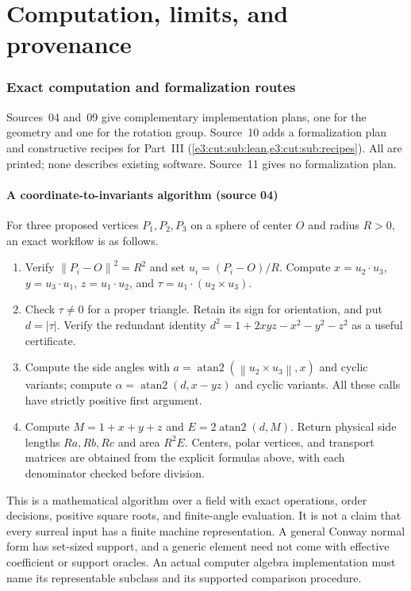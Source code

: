 \documentclass[11pt,letterpaper]{article}
\numberwithin{equation}{section}
\theoremstyle{definition}
\theoremstyle{remark}
\newcommand{\atantwo}{\operatorname{atan2}}
\newcommand{\norm}[1]{\left\lVert#1\right\rVert}
\begin{document}
\part{Computation, limits, and provenance}\label{e3:part:limits}

\section{Exact computation and formalization routes}\label{e3:sec:implementation}

Sources~04 and~09 give complementary implementation plans, one for the
geometry and one for the rotation group. Source~10 adds a formalization plan
and constructive recipes for Part~III (\cref{e3:cut:sub:lean,e3:cut:sub:recipes}).
All are printed; none describes existing software. Source~11 gives no
formalization plan.

\subsection{A coordinate-to-invariants algorithm (source 04)}\label{e3:sub:impl04}

For three proposed vertices $P_1,P_2,P_3$ on a sphere of center $O$
and radius $R>0$, an exact workflow is as follows.
\begin{enumerate}[label=\arabic*.,leftmargin=2em]
\item Verify $\norm{P_i-O}^2=R^2$ and set $u_i=(P_i-O)/R$.
Compute $x=u_2\cdot u_3$, $y=u_3\cdot u_1$, $z=u_1\cdot u_2$,
and $\tau=u_1\cdot(u_2\times u_3)$.
\item Check $\tau\ne0$ for a proper triangle. Retain its sign for
orientation, and put $d=|\tau|$. Verify the redundant identity
$d^2=1+2xyz-x^2-y^2-z^2$ as a useful certificate.
\item Compute the side angles with
$a=\atantwo(\norm{u_2\times u_3},x)$ and cyclic variants;
compute $\alpha=\atantwo(d,x-yz)$ and cyclic variants.
All these calls have strictly positive first argument.
\item Compute $M=1+x+y+z$ and $E=2\atantwo(d,M)$.
Return physical side lengths $Ra,Rb,Rc$ and area $R^2E$.
Centers, polar vertices, and transport matrices are obtained from the
explicit formulas above, with each denominator checked before division.
\end{enumerate}

This is a mathematical algorithm over a field with exact operations,
order decisions, positive square roots, and finite-angle evaluation.
It is not a claim that every surreal input has a finite machine
representation. A general Conway normal form has set-sized support,
and a generic element need not come with effective coefficient or
support oracles. An actual computer algebra implementation must name
its representable subclass and its supported comparison procedure.
\end{document}

